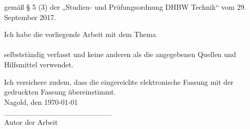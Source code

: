 
	\label{sec:eid-erk}
\vspace{1 cm}
gemäß § 5 (3) der „Studien- und Prüfungsordnung DHBW Technik“ vom 29. September 2017.\newline
\vspace{2 cm}
\begin{center}
Ich habe die vorliegende Arbeit mit dem Thema\vspace{1 cm}\\
\vspace{1 cm}\\
selbstständig verfasst und keine anderen als die angegebenen Quellen und Hilfsmittel verwendet.\vspace{2 cm}\\
\end{center}
Ich versichere zudem, dass die eingereichte elektronische Fassung mit der gedruckten Fassung übereinstimmt.\vspace{4 cm}\\
Nagold, den \today \vspace{1.5 cm}\\
\_\_\_\_\_\_\_\_\_\_\_\_\_\_\_\_\_\_\_\_\\
Autor der Arbeit

\vfill